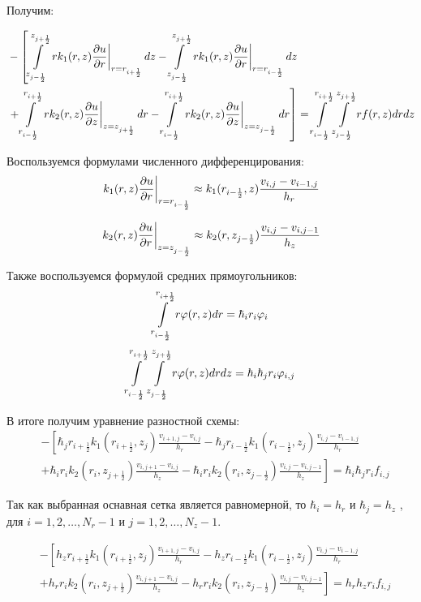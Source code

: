 Получим:

\begin{align*}
  &- \left [
   \mLimZ{z}{+\frac{1}{2}}{-\frac{1}{2}}{j}  \left . r k_1(r, z) \pdv{u}{r} \right \vert_{r = r_{i + \frac{1}{2}}} dz
  - \mLimZ{z}{+\frac{1}{2}}{-\frac{1}{2}}{j} \left . r k_1(r, z) \pdv{u}{r} \right \vert_{r = r_{i - \frac{1}{2}}} dz
  \right . \\
  &\left . + \mLimS{r}{+\frac{1}{2}}{-\frac{1}{2}} \left . rk_2(r, z)\pdv{u}{z} \right \vert_{z = z_{j + \frac{1}{2}}} dr
  - \mLimS{r}{+\frac{1}{2}}{-\frac{1}{2}} \left . rk_2(r, z)\pdv{u}{z} \right \vert_{z = z_{j - \frac{1}{2}}} dr
  \right ] = \mLim{+\frac{1}{2}}{-\frac{1}{2}}{+\frac{1}{2}}{-\frac{1}{2}} rf(r, z) dr dz
\end{align*}

Воспользуемся формулами численного дифференцирования:
\[
  \left . k_1(r, z) \pdv{u}{r} \right \vert_{r = r_{i - \frac{1}{2}}}
  \approx k_1(r_{i - \frac{1}{2}}, z) 
  \frac{v_{i, j} - v_{i - 1, j}}{h_r}
\]

\[
  \left . k_2(r, z) \pdv{u}{r} \right \vert_{z = z_{j - \frac{1}{2}}}
  \approx k_2(r, z_{j - \frac{1}{2}}) 
  \frac{v_{i, j} - v_{i, j - 1}}{h_z}
\]

Также воспользуемся формулой средних прямоугольников:
\[
  \mLimS{r}{+\frac{1}{2}}{-\frac{1}{2}} r \varphi(r, z) dr
  = \hbar_i r_i \varphi_i
\]
\[
  \mLim{+\frac{1}{2}}{-\frac{1}{2}}{+\frac{1}{2}}{-\frac{1}{2}} r \varphi(r, z) drdz
  = \hbar_i\hbar_j r_i \varphi_{i, j}
\]

В итоге получим уравнение разностной схемы:
\begin{align*}
  &- \left [ 
  \hbar_j r_{i+\frac{1}{2}} k_1(r_{i+\frac{1}{2}}, z_j) \frac{v_{i+1, j} - v_{i, j}}{h_{r}}
  - \hbar_j r_{i-\frac{1}{2}} k_1(r_{i-\frac{1}{2}}, z_j) \frac{v_{i, j} - v_{i - 1, j}}{h_{r}}
  \right . \\
  &\left .
  + \hbar_i r_{i} k_2(r_i, z_{j+\frac{1}{2}}) \frac{v_{i, j + 1} - v_{i, j}}{h_{z}}
  - \hbar_i r_{i} k_2(r_i, z_{j-\frac{1}{2}}) \frac{v_{i, j} - v_{i, j - 1}}{h_z}
  \right ]  = \hbar_i \hbar_j r_i f_{i, j}
\end{align*}

Так как выбранная оснавная сетка является равномерной, то $ \hbar_i = h_r $ и $ \hbar_j = h_z$
, для $ i = 1, 2, \dots, N_r - 1 $ и $ j = 1, 2, \dots, N_z - 1$.

\begin{align*}
  &- \left [ 
  h_z r_{i+\frac{1}{2}} k_1(r_{i+\frac{1}{2}}, z_j) \frac{v_{i+1, j} - v_{i, j}}{h_{r}}
  - h_z r_{i-\frac{1}{2}} k_1(r_{i-\frac{1}{2}}, z_j) \frac{v_{i, j} - v_{i - 1, j}}{h_{r}}
  \right . \\
  &\left .
  + h_r r_{i} k_2(r_i, z_{j+\frac{1}{2}}) \frac{v_{i, j + 1} - v_{i, j}}{h_{z}}
  - h_r r_{i} k_2(r_i, z_{j-\frac{1}{2}}) \frac{v_{i, j} - v_{i, j - 1}}{h_z}
  \right ]  = h_r h_z r_i f_{i, j}
\end{align*}

